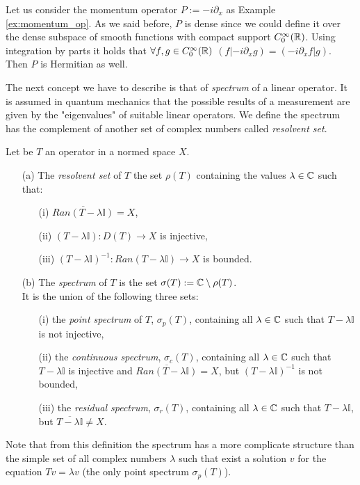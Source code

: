  \begin{example}
 	Let us consider the momentum operator $P:=-i\partial_x$ as Example \ref{ex:momentum_op}. As we said before, $P$ is dense since we could define it over the dense subspace of smooth functions with compact support $C^\infty_0({\mathbb R})$. Using integration by parts it holds that $\forall f,g\in C^\infty_0({\mathbb R})$ $(f|-i\partial_x g)=(-i\partial_x f|g)$. Then $P$ is Hermitian as well. 
 \end{example}
 
 The next concept we have to describe is that of \textit{spectrum} of a linear operator. It is assumed in quantum mechanics that the possible results of a measurement are given by the "eigenvalues" of suitable linear operators. We define the spectrum has the complement of another set of complex numbers called \textit{resolvent set}.
 \begin{definition}
 	Let be $T$ an operator in a normed space $X$.
 	\begin{itemize}
 		\item[(a)] The \textit{resolvent set} of $T$ the set $\rho(T)$ containing the values $\lambda\in{\mathbb C}$ such that:
 		\begin{itemize}
 			\item[(i)] $\overline{Ran(T-\lambda\mathbb{I})}=X$,
 			\item[(ii)] $(T-\lambda\mathbb{I}):D(T)\to X$ is injective,
 			\item[(iii)] $(T-\lambda\mathbb{I})^{-1}:Ran(T-\lambda\mathbb{I})\to X$ is bounded.
 		\end{itemize}
 		\item[(b)] The \textit{spectrum} of $T$ is the set $\sigma(T):={\mathbb C}\setminus\rho(T)$.\\
 		It is the union of the following three sets:
 		\begin{itemize}
 			\item[(i)] the \textit{point spectrum} of $T$, $\sigma_p(T)$, containing all $\lambda\in{\mathbb C}$ such that $T-\lambda\mathbb{I}$ is not injective,
 			\item[(ii)] the \textit{continuous spectrum}, $\sigma_c(T)$, containing all $\lambda\in{\mathbb C}$ such that $T-\lambda\mathbb{I}$ is injective and $\overline{Ran(T-\lambda\mathbb{I})}=X$, but $(T-\lambda\mathbb{I})^{-1}$ is not bounded,
 			\item[(iii)] the \textit{residual spectrum}, $\sigma_r(T)$, containing all $\lambda\in{\mathbb C}$  such that $T-\lambda\mathbb{I}$, but $\overline{T-\lambda\mathbb{I}}\neq X$.
 		\end{itemize} 
 	\end{itemize}
 \end{definition}
 \begin{oss}
 	 Note that from this definition the spectrum has a more complicate structure than the simple set of all complex numbers $\lambda$ such that exist a solution $v$ for the equation $Tv=\lambda v$ (the only point spectrum $\sigma_p(T)$).
 \end{oss}

